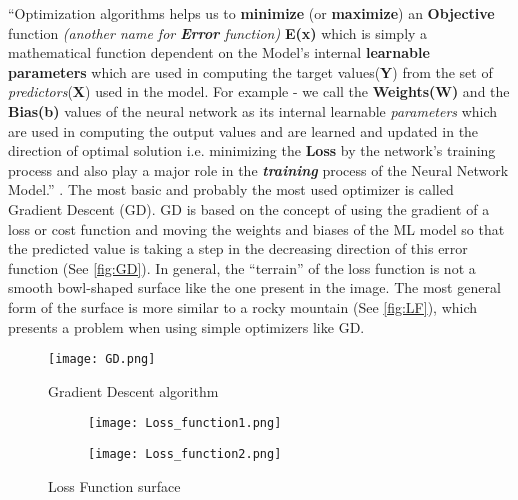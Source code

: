 “Optimization algorithms helps us to \textbf{minimize} (or \textbf{maximize}) an \textbf{Objective} function
\textit{(another name for \textbf{Error} function)} \textbf{E(x)} which is simply a mathematical function dependent on the Model’s internal \textbf{learnable parameters}
which are used in computing the target values(\textbf{Y}) from the set of \textit{predictors}(\textbf{X}) used in the model. 
For example - we call the \textbf{Weights(W)} and the \textbf{Bias(b)} values of the neural network as its internal learnable \textit{parameters} 
which are used in computing the output values and are learned and updated in the direction of optimal solution i.e. 
minimizing the \textbf{Loss} by the network’s training process and also play a major role in the \textit{\textbf{training}} process of the Neural Network Model.” \cite{optimizaiton_algorithms}.
The most basic and probably the most used optimizer is called Gradient Descent (GD). 
GD is based on the concept of using the gradient of a loss or cost function and moving the weights and biases of the ML model so that the predicted value is taking a step in the decreasing direction of this error function 
(See \autoref{fig:GD}). In general, the “terrain” of the loss function is not a smooth bowl-shaped surface like the one present in the image. The most general form of the surface is more similar to a rocky mountain (See \autoref{fig:LF}), which presents a problem when using simple optimizers like GD.


\begin{figure}
\begin{center}

\texttt{[image: GD.png]}
\caption{Gradient Descent algorithm\label{fig:GD}}
\end{center}

\end{figure}



\begin{figure}
\begin{center}

\begin{subfigure}{.5\linewidth}
\texttt{[image: Loss\_function1.png]}
\end{subfigure}

\begin{subfigure}{.5\linewidth}
\texttt{[image: Loss\_function2.png]}
\end{subfigure}

\caption{Loss Function surface\label{fig:LF}}
\end{center}

\end{figure}


